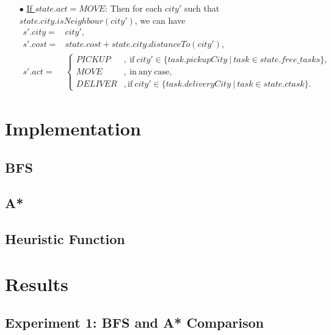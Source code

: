 \documentclass[11pt]{article}
\begin{document}
\begin{itemize}
			
	\item[$\bullet$] \underline{If $state.act=MOVE$}:  Then for each $city'$ such that $state.city.isNeighbour(city')$, we can have 
		\begin{align*}
			s'.city =& city',\\
			s'.cost =& state.cost+state.city.distanceTo(city'),\\
			s'.act =& \begin{cases}
						PICKUP &,\ \mathrm{if}\ city'\in\{task.pickupCity\ |\ task\in state.free\_tasks\},\\
						MOVE &,\ \mathrm{in\ any\  case},\\
						DELIVER  &, \mathrm{if}\ city'\in\{task.deliveryCity\ |\ task\in state.ctask\}.
					\end{cases}
		\end{align*}
\end{itemize}
			

\section{Implementation}

\subsection{BFS}

\subsection{A*}

\subsection{Heuristic Function}


\section{Results}

\subsection{Experiment 1: BFS and A* Comparison}
\end{document}
